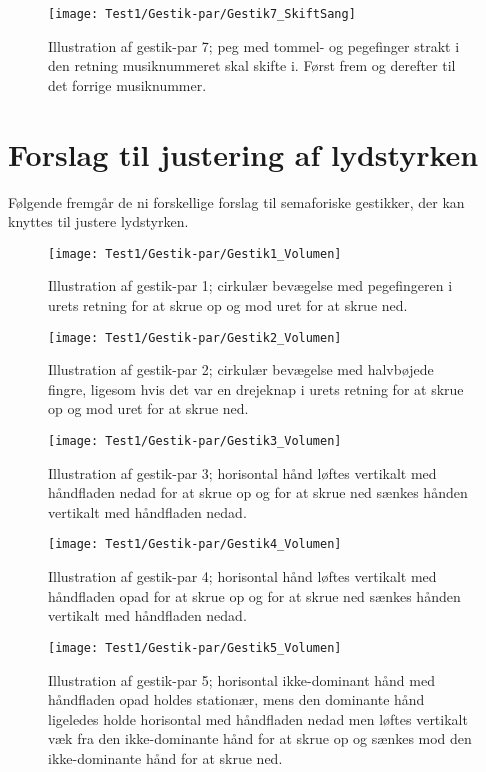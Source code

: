 \noindent
%
%
\begin{figure}[H]
	\centering
	\texttt{[image: Test1/Gestik-par/Gestik7\_SkiftSang]}
	\caption{Illustration af gestik-par 7; peg med tommel- og pegefinger strakt i den retning musiknummeret skal skifte i. Først frem og derefter til det forrige musiknummer.}
	\label{fig:GestikPar7SkiftApp}
\end{figure}
\noindent
%

\section{Forslag til justering af lydstyrken}
\label{app:ForslagVolumen}
%
Følgende fremgår de ni forskellige forslag til semaforiske gestikker, der kan knyttes til justere lydstyrken.
%
\begin{figure}[H]
	\centering
	\texttt{[image: Test1/Gestik-par/Gestik1\_Volumen]}
	\caption{Illustration af gestik-par 1; cirkulær bevægelse med pegefingeren i urets retning for at skrue op og mod uret for at skrue ned.}
	\label{fig:GestikPar1VolumenApp}
\end{figure}
\noindent
%
%
\begin{figure}[H]
	\centering
	\texttt{[image: Test1/Gestik-par/Gestik2\_Volumen]}
	\caption{Illustration af gestik-par 2; cirkulær bevægelse med halvbøjede fingre, ligesom hvis det var en drejeknap i urets retning for at skrue op og mod uret for at skrue ned.}
	\label{fig:GestikPar2VolumenApp}
\end{figure}
\noindent
%
%
\begin{figure}[H]
	\centering
	\texttt{[image: Test1/Gestik-par/Gestik3\_Volumen]}
	\caption{Illustration af gestik-par 3; horisontal hånd løftes vertikalt med håndfladen nedad for at skrue op og for at skrue ned sænkes hånden vertikalt med håndfladen nedad.}
	\label{fig:GestikPar3VolumenApp}
\end{figure}
\noindent
%
%
\begin{figure}[H]
	\centering
	\texttt{[image: Test1/Gestik-par/Gestik4\_Volumen]}
	\caption{Illustration af gestik-par 4; horisontal hånd løftes vertikalt med håndfladen opad for at skrue op og for at skrue ned sænkes hånden vertikalt med håndfladen nedad.}
	\label{fig:GestikPar4VolumenApp}
\end{figure}
\noindent
%
%
\begin{figure}[H]
	\centering
	\texttt{[image: Test1/Gestik-par/Gestik5\_Volumen]}
	\caption{Illustration af gestik-par 5; horisontal ikke-dominant hånd med håndfladen opad holdes stationær, mens den dominante hånd ligeledes holde horisontal med håndfladen nedad men løftes vertikalt væk fra den ikke-dominante hånd for at skrue op og sænkes mod den ikke-dominante hånd for at skrue ned.}
	\label{fig:GestikPar5VolumenApp}
\end{figure}
